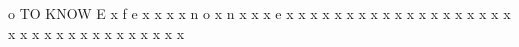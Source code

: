 \documentclass{article}%
\begin{document}
o\newline%
TO KNOW E\newline%
x\newline%
f\newline%
e\newline%
x\newline%
x\newline%
x\newline%
x\newline%
n\newline%
o\newline%
x\newline%
n\newline%
x\newline%
x\newline%
x\newline%
e\newline%
x\newline%
x\newline%
x\newline%
x\newline%
x\newline%
x\newline%
x\newline%
x\newline%
x\newline%
x\newline%
x\newline%
x\newline%
x\newline%
x\newline%
x\newline%
x\newline%
x\newline%
x\newline%
x\newline%
x\newline%
x\newline%
x\newline%
x\newline%
x\newline%
x\newline%
x\newline%
x\newline%
x\newline%
x\newline%
x\newline%
x\newline%
x\newline%
x\newline%
x\newline%
\end{document}
